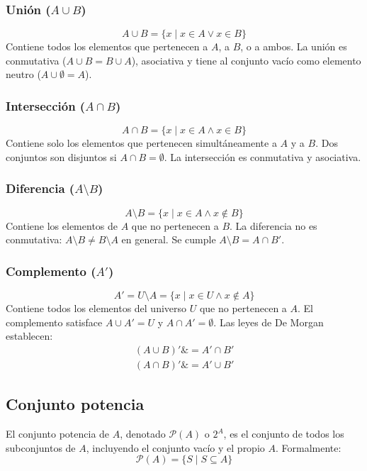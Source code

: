 \documentclass[11pt,a4paper]{article}
\begin{document}
\subsubsection{Unión ($A \cup B$)}
\begin{equation}
A \cup B = \{ x \mid x \in A \lor x \in B \}
\end{equation}
Contiene todos los elementos que pertenecen a $A$, a $B$, o a ambos. La unión es conmutativa ($A \cup B = B \cup A$), asociativa y tiene al conjunto vacío como elemento neutro ($A \cup \emptyset = A$).

\subsubsection{Intersección ($A \cap B$)}
\begin{equation}
A \cap B = \{ x \mid x \in A \land x \in B \}
\end{equation}
Contiene solo los elementos que pertenecen simultáneamente a $A$ y a $B$. Dos conjuntos son disjuntos si $A \cap B = \emptyset$. La intersección es conmutativa y asociativa.

\subsubsection{Diferencia ($A \setminus B$)}
\begin{equation}
A \setminus B = \{ x \mid x \in A \land x \notin B \}
\end{equation}
Contiene los elementos de $A$ que no pertenecen a $B$. La diferencia no es conmutativa: $A \setminus B \neq B \setminus A$ en general. Se cumple $A \setminus B = A \cap B'$.

\subsubsection{Complemento ($A'$)}
\begin{equation}
A' = U \setminus A = \{ x \mid x \in U \land x \notin A \}
\end{equation}
Contiene todos los elementos del universo $U$ que no pertenecen a $A$. El complemento satisface $A \cup A' = U$ y $A \cap A' = \emptyset$. Las leyes de De Morgan establecen:
\begin{align}
(A \cup B)' \&= A' \cap B' \\
(A \cap B)' \&= A' \cup B'
\end{align}

\subsection{Conjunto potencia}
El conjunto potencia de $A$, denotado $\mathcal{P}(A)$ o $2^A$, es el conjunto de todos los subconjuntos de $A$, incluyendo el conjunto vacío y el propio $A$. Formalmente:
\begin{equation}
\mathcal{P}(A) = \{ S \mid S \subseteq A \}
\end{equation}
\end{document}

